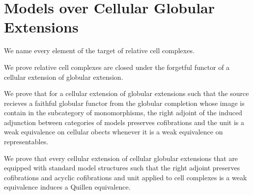 \section{Models over Cellular Globular Extensions}\label{sec: models over cellular globularextensions}

We name every element of the target of relative cell complexes.

We prove relative cell complexes are closed under the forgetful functor of a cellular extension of globular extension.

We prove that for a cellular extension of globular extensions such that the source recieves a faithful globular functor from the globular completion whose image is contain in the subcategory of monomorphisms, the right adjoint of the induced adjunction between categories of models preserves cofibrations and the unit is a weak equivalence on cellular obects whenever it is a weak equivalence on representables.

We prove that every cellular extension of cellular globular extensions that are equipped with standard model structures such that the right adjoint preserves cofibrations and acyclic cofibrations and unit applied to cell complexes is a weak equivalence induces a Quillen equivalence.